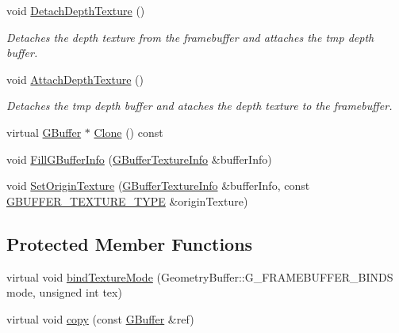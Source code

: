 \begin{DoxyCompactItemize}
\item 
\mbox{\label{class_geometry_engine_1_1_geometry_buffer_1_1_g_buffer_a95a83a79632226dd0cc8878af9c76f62}} 
void \mbox{\hyperlink{class_geometry_engine_1_1_geometry_buffer_1_1_g_buffer_a95a83a79632226dd0cc8878af9c76f62}{Detach\+Depth\+Texture}} ()
\begin{DoxyCompactList}\small\item\em Detaches the depth texture from the framebuffer and attaches the tmp depth buffer. \end{DoxyCompactList}\item 
\mbox{\label{class_geometry_engine_1_1_geometry_buffer_1_1_g_buffer_a3a95e0e90117676e44a29c09eb15c65d}} 
void \mbox{\hyperlink{class_geometry_engine_1_1_geometry_buffer_1_1_g_buffer_a3a95e0e90117676e44a29c09eb15c65d}{Attach\+Depth\+Texture}} ()
\begin{DoxyCompactList}\small\item\em Detaches the tmp depth buffer and ataches the depth texture to the framebuffer. \end{DoxyCompactList}\item 
virtual \mbox{\hyperlink{class_geometry_engine_1_1_geometry_buffer_1_1_g_buffer}{G\+Buffer}} $\ast$ \mbox{\hyperlink{class_geometry_engine_1_1_geometry_buffer_1_1_g_buffer_af993f8c23f7e78051f3071be4873af9d}{Clone}} () const
\item 
void \mbox{\hyperlink{class_geometry_engine_1_1_geometry_buffer_1_1_g_buffer_ad1242e69d277b69b58497f7d489e176c}{Fill\+G\+Buffer\+Info}} (\mbox{\hyperlink{class_geometry_engine_1_1_g_buffer_texture_info}{G\+Buffer\+Texture\+Info}} \&buffer\+Info)
\item 
void \mbox{\hyperlink{class_geometry_engine_1_1_geometry_buffer_1_1_g_buffer_a71a3e1b70c0b96a1b63c033e8cf4b59f}{Set\+Origin\+Texture}} (\mbox{\hyperlink{class_geometry_engine_1_1_g_buffer_texture_info}{G\+Buffer\+Texture\+Info}} \&buffer\+Info, const \mbox{\hyperlink{class_geometry_engine_1_1_geometry_buffer_1_1_g_buffer_a718dceafcac1915f7de061108597e1cc}{G\+B\+U\+F\+F\+E\+R\+\_\+\+T\+E\+X\+T\+U\+R\+E\+\_\+\+T\+Y\+PE}} \&origin\+Texture)
\end{DoxyCompactItemize}
\subsection*{Protected Member Functions}
\begin{DoxyCompactItemize}
\item 
virtual void \mbox{\hyperlink{class_geometry_engine_1_1_geometry_buffer_1_1_g_buffer_a0aec7c721a63bfbb7b50882e4a34a861}{bind\+Texture\+Mode}} (Geometry\+Buffer\+::\+G\+\_\+\+F\+R\+A\+M\+E\+B\+U\+F\+F\+E\+R\+\_\+\+B\+I\+N\+DS mode, unsigned int tex)
\item 
virtual void \mbox{\hyperlink{class_geometry_engine_1_1_geometry_buffer_1_1_g_buffer_a9f20eb78703ef048d59a54f90ee09f25}{copy}} (const \mbox{\hyperlink{class_geometry_engine_1_1_geometry_buffer_1_1_g_buffer}{G\+Buffer}} \&ref)
\end{DoxyCompactItemize}
